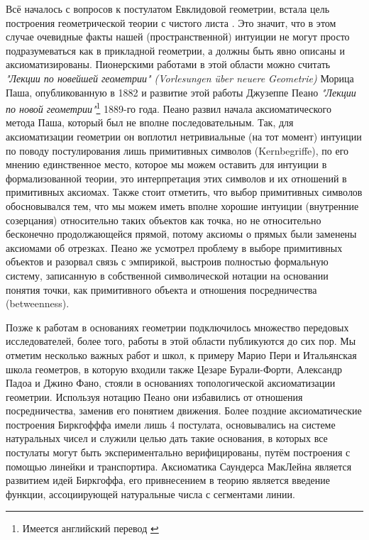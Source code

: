 \documentclass[14pt]{extarticle}
\begin{document}
	Всё началось с вопросов к постулатом Евклидовой геометрии, встала цель построения геометрической теории с чистого листа \cite[288]{rodin2020}. Это значит, что в этом случае очевидные факты нашей (пространственной) интуиции не могут просто подразумеваться как в прикладной геометрии, а должны быть явно описаны и аксиоматизированы. Пионерскими работами в этой области можно считать \textit{"Лекции по новейшей геометрии" (Vorlesungen über neuere Geometrie)} Морица Паша, опубликованную в 1882 и развитие этой работы Джузеппе Пеано \textit{"Лекции по новой геометрии"}\footnote {Имеется английский перевод \cite{JeanVanHeijenoort}} 1889-го года. Пеано развил начала аксиоматического метода Паша, который был не вполне последовательным. Так, для аксиоматизации геометрии он воплотил нетривиальные (на тот момент) интуиции по поводу постулирования лишь примитивных символов (Kernbegriffe), по его мнению единственное место, которое мы можем оставить для интуиции в формализованной теории, это интерпретация этих символов и их отношений в примитивных аксиомах. Также стоит отметить, что выбор примитивных символов обосновывался тем, что мы можем иметь вполне хорошие интуиции (внутренние созерцания) относительно таких объектов как точка, но не относительно бесконечно продолжающейся прямой, потому аксиомы о прямых были заменены аксиомами об отрезках. Пеано же усмотрел проблему в выборе примитивных объектов и разорвал связь с эмпирикой, выстроив полностью формальную систему, записанную в собственной символической нотации на основании понятия точки, как примитивного объекта и отношения посредничества (betweenness).
	
	Позже к работам в основаниях геометрии подключилось множество передовых исследователей, более того, работы в этой области публикуются до сих пор. Мы отметим несколько важных работ и школ, к примеру Марио Пери и Итальянская школа геометров, в которую входили также Цезаре Бурали-Форти, Александр Падоа и Джино Фано, стояли в основаниях топологической аксиоматизации геометрии. Используя нотацию Пеано они избавились от отношения посредничества, заменив его понятием движения. Более поздние аксиоматические построения Биркгофффа \cite{Birkhoff1932} имели лишь 4 постулата, основывались на системе натуральных чисел и служили целью дать такие основания, в которых все постулаты могут быть экспериментально верифицированы, путём построения с помощью линейки и транспортира. Аксиоматика Саундерса МакЛейна \cite{MacLane1959} является развитием идей Биркгоффа, его привнесением в теорию является введение функции, ассоциирующей натуральные числа с сегментами линии. 
	
\end{document}
